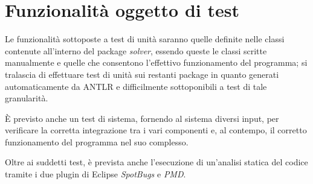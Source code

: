 \documentclass[12pt]{article}
\begin{document}
\section{Funzionalità oggetto di test}
Le funzionalità sottoposte a test di unità saranno quelle definite nelle classi contenute all'interno del package \textit{solver}, essendo queste le classi scritte manualmente e quelle che consentono l'effettivo funzionamento del programma; si tralascia di effettuare test di unità sui restanti package in quanto generati automaticamente da ANTLR e difficilmente sottoponibili a test di tale granularità. \par
È previsto anche un test di sistema, fornendo al sistema diversi input, per verificare la corretta integrazione tra i vari componenti e, al contempo, il corretto funzionamento del programma nel suo complesso. \par
Oltre ai suddetti test, è prevista anche l'esecuzione di un'analisi statica del codice tramite i due plugin di Eclipse \textit{SpotBugs} e \textit{PMD}.
\end{document}
